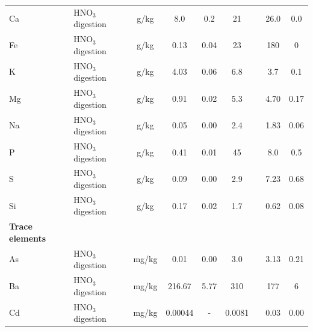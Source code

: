 \begin{table}
{\begin{tabular}{llccccccc}
Ca                      & $\mathrm{HNO_3}$ digestion & g/kg      & 8.0               & 0.2              & 21               &                   & 26.0            & 0.0                \\
Fe                      & $\mathrm{HNO_3}$ digestion & g/kg      & 0.13              & 0.04             & 23               &                   & 180             & 0                  \\
K                       & $\mathrm{HNO_3}$ digestion & g/kg      & 4.03              & 0.06             & 6.8              &                   & 3.7             & 0.1                \\
Mg                      & $\mathrm{HNO_3}$ digestion & g/kg      & 0.91              & 0.02             & 5.3              &                   & 4.70            & 0.17               \\
Na                      & $\mathrm{HNO_3}$ digestion & g/kg      & 0.05              & 0.00             & 2.4              &                   & 1.83            & 0.06               \\
P                       & $\mathrm{HNO_3}$ digestion & g/kg      & 0.41              & 0.01             & 45               &                   & 8.0             & 0.5                \\
S                       & $\mathrm{HNO_3}$ digestion & g/kg      & 0.09              & 0.00             & 2.9              &                   & 7.23            & 0.68               \\
Si                      & $\mathrm{HNO_3}$ digestion & g/kg      & 0.17              & 0.02             & 1.7              &                   & 0.62            & 0.08               \\ \addlinespace \hline
\textbf{Trace elements} & \textbf{}      &           &                   &                  &                  &                   &                 &                    \\ \hline \addlinespace
As                      & $\mathrm{HNO_3}$ digestion & mg/kg     & 0.01              & 0.00             & 3.0              &                   & 3.13            & 0.21               \\
Ba                      & $\mathrm{HNO_3}$ digestion & mg/kg     & 216.67            & 5.77             & 310              &                   & 177             & 6                  \\
Cd                      & $\mathrm{HNO_3}$ digestion & mg/kg     & 0.00044           & -                & 0.0081           &                   & 0.03            & 0.00               \\

\end{tabular}}
\end{table}
